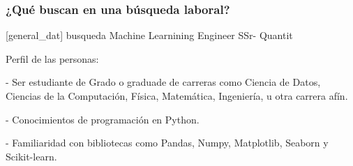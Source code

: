 \documentclass[aspectratio=169,12pt]{beamer}
\begin{document}

\begin{frame}
\frametitle{¿Qué buscan en una búsqueda laboral?}

[general\_dat] busqueda Machine Learnining Engineer SSr- Quantit

Perfil de las personas:

- Ser estudiante de Grado o graduade de carreras como Ciencia de Datos, Ciencias de la Computación, Física, Matemática, Ingeniería, u otra carrera afín.

- Conocimientos de programación en Python.

- Familiaridad con bibliotecas como Pandas, Numpy, Matplotlib,  Seaborn y Scikit-learn.

\end{frame}
\end{document}
